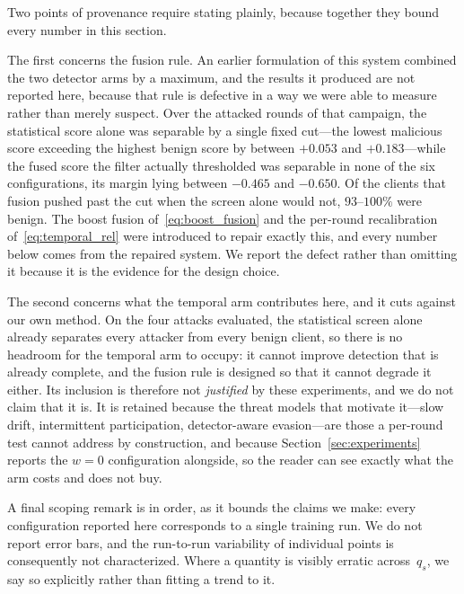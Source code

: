 \documentclass[journal]{IEEEtran}
\begin{document}
Two points of provenance require stating plainly, because together they bound every number in this section.

The first concerns the fusion rule. An earlier formulation of this system combined the two detector arms by a maximum, and the results it produced are not reported here, because that rule is defective in a way we were able to measure rather than merely suspect. Over the attacked rounds of that campaign, the statistical score alone was separable by a single fixed cut---the lowest malicious score exceeding the highest benign score by between $+0.053$ and $+0.183$---while the fused score the filter actually thresholded was separable in none of the six configurations, its margin lying between $-0.465$ and $-0.650$. Of the clients that fusion pushed past the cut when the screen alone would not, $93$--$100\%$ were benign. The boost fusion of~\eqref{eq:boost_fusion} and the per-round recalibration of~\eqref{eq:temporal_rel} were introduced to repair exactly this, and every number below comes from the repaired system. We report the defect rather than omitting it because it is the evidence for the design choice.

The second concerns what the temporal arm contributes here, and it cuts against our own method. On the four attacks evaluated, the statistical screen alone already separates every attacker from every benign client, so there is no headroom for the temporal arm to occupy: it cannot improve detection that is already complete, and the fusion rule is designed so that it cannot degrade it either. Its inclusion is therefore not \emph{justified} by these experiments, and we do not claim that it is. It is retained because the threat models that motivate it---slow drift, intermittent participation, detector-aware evasion---are those a per-round test cannot address by construction, and because Section~\ref{sec:experiments} reports the $w=0$ configuration alongside, so the reader can see exactly what the arm costs and does not buy.

A final scoping remark is in order, as it bounds the claims we make: every configuration reported here corresponds to a single training run. We do not report error bars, and the run-to-run variability of individual points is consequently not characterized. Where a quantity is visibly erratic across~$q_s$, we say so explicitly rather than fitting a trend to it.
\end{document}
